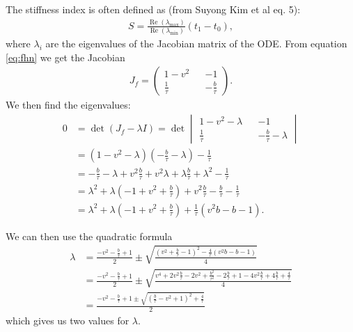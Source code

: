 The stiffness index is often defined as (from Suyong Kim et al eq. 5):
\begin{align}
	S = \frac{\operatorname{Re}\left(\lambda_{\max }\right)}{\operatorname{Re}\left(\lambda_{\min }\right)}\left(t_{1}-t_{0}\right),
\end{align}
where $\lambda_i$ are the eigenvalues of the Jacobian matrix of the ODE. From equation \ref{eq:fhn} we get the Jacobian
\begin{align}
	J_f = \begin{pmatrix} %
		1 - v^2 && -1 \\
		\frac{1}{\tau} && - \frac{b}{\tau} 
	\end{pmatrix}.\end{align}
We then find the eigenvalues:
\begin{align}
	0 &= \det (J_f - \lambda I) 
	= \det \begin{vmatrix}
		1 - v^2 -\lambda && -1 \\
		\frac{1}{\tau} && - \frac{b}{\tau} -\lambda
	\end{vmatrix} \\
	&= \left( 1-v^2-\lambda\right)  \left( -\frac{b}{\tau} -\lambda \right) - \frac{1}{\tau} \\
	&= -\frac{b}{\tau} - \lambda + v^2 \frac{b}{\tau} + v^2\lambda + \lambda \frac{b}{\tau} + \lambda^2 - \frac{1}{\tau} \\
	&= \lambda^2 + \lambda \left( -1 + v^2 + \frac{b}{\tau} \right) + v^2\frac{b}{\tau} - \frac{b}{\tau} - \frac{1}{\tau} \\
	&= \lambda^2 + \lambda \left( -1 + v^2 + \frac{b}{\tau} \right) + \frac{1}{\tau} \left(  v^2 b - b - 1 \right).
\end{align}

We can then use the quadratic formula
\begin{align}
	\lambda &= \frac{- v^2 - \frac{b}{\tau} + 1}{2} \pm  \sqrt{\frac{ \left( v^2 + \frac{b}{\tau} -1 \right)^2 - \frac{4}{\tau} \left(  v^2 b - b - 1 \right) }{4}} \\
	&= \frac{- v^2 - \frac{b}{\tau} + 1}{2} \pm  \sqrt{\frac{ v^4 + 2v^2 \frac{b}{\tau} - 2v^2 + \frac{b^2}{\tau^2} - 2 \frac{b}{\tau} + 1 - 4v^2 \frac{b}{\tau} + 4\frac{b}{\tau} + \frac{4}{\tau} }{4}} \\
	&= \frac{- v^2 - \frac{b}{\tau} + 1  \pm  \sqrt{ \left(\frac{b}{\tau} - v^2 + 1 \right)^2 + \frac{4}{\tau} }}{2}
\end{align}
which gives us two values for $\lambda$. 

